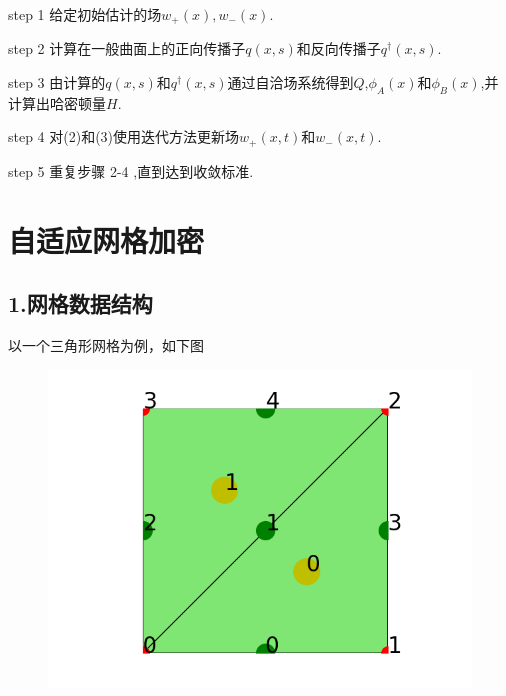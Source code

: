 \documentclass{article}
\begin{document}
step 1 给定初始估计的场$w_+(x), w_-(x)$.

step 2 计算在一般曲面上的正向传播子$q(x,s)$和反向传播子$q^{\dagger}(x,s)$.

step 3 由计算的$q(x,s)$和$q^{\dagger}(x,s)$通过自洽场系统得到$Q$,$\phi_A(x)$和$\phi_B(x)$,并计算出哈密顿量$H$.

step 4 对(2)和(3)使用迭代方法更新场$w_+(x,t)$和$w_-(x,t)$.

step 5 重复步骤 2-4 ,直到达到收敛标准.
\newpage
\section{自适应网格加密}
\subsection{1.网格数据结构}
以一个三角形网格为例，如下图
\begin{figure}[H]
\centering
\includegraphics[scale=0.5]{./figures/picture_2.png}
\caption{}
\end{figure}
\end{document}
